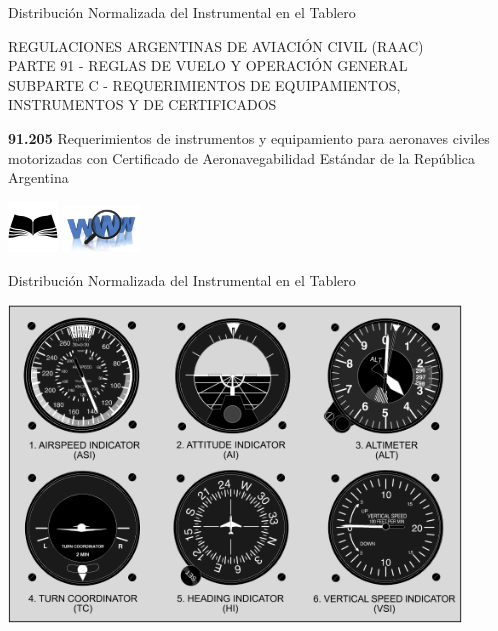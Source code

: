 





\begin{frame}{Distribuci\'on Normalizada del Instrumental en el
 Tablero}
  

REGULACIONES ARGENTINAS DE AVIACI\'ON CIVIL (RAAC)\\
PARTE 91 - REGLAS DE VUELO Y OPERACI\'ON GENERAL\\
SUBPARTE C - REQUERIMIENTOS DE EQUIPAMIENTOS, INSTRUMENTOS Y DE
CERTIFICADOS\\

\vspace{3mm}

\colorbox{yellow!30}{\parbox{0.9\textwidth}{{\bf 91.205} \qquad
Requerimientos de instrumentos y equipamiento para aeronaves civiles motorizadas con
Certificado de Aeronavegabilidad Est\'andar de la Rep\'ublica Argentina}
}

\href{run:biblio/parte-91-19feb2016-res-77-16.pdf}{\includegraphics[width=0.1\textwidth]{imagenes/libro.png}}
\hspace{3mm}
\href{http://www.anac.gov.ar/anac/web/uploads/normativa/raac/raac_vigentes/por_parte/parte-91-23dic2014.pdf}{\includegraphics[width=0.15\textwidth]{imagenes/www-logo.png}}

\end{frame}

\begin{frame}{Distribuci\'on Normalizada del Instrumental en el
 Tablero}

\includegraphics[width=0.9\textwidth]{imagenes/1.3.distribucion.normalizada.instrumental.en.tablero/6_pack.png}

\end{frame}

